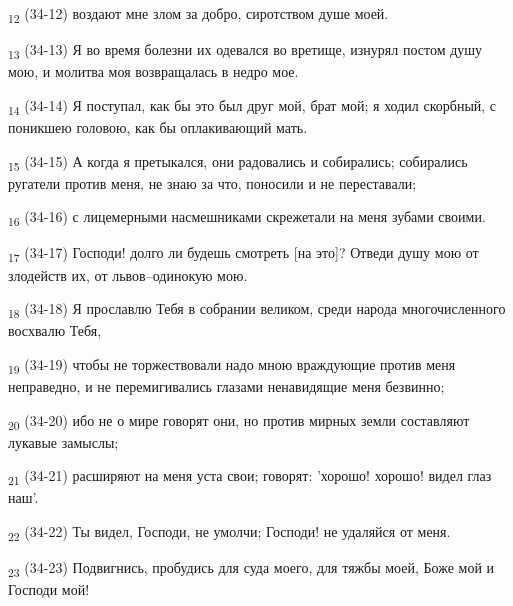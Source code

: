 \begin{tcolorbox}
\textsubscript{12} (34-12) воздают мне злом за добро, сиротством душе моей.
\end{tcolorbox}
\begin{tcolorbox}
\textsubscript{13} (34-13) Я во время болезни их одевался во вретище, изнурял постом душу мою, и молитва моя возвращалась в недро мое.
\end{tcolorbox}
\begin{tcolorbox}
\textsubscript{14} (34-14) Я поступал, как бы это был друг мой, брат мой; я ходил скорбный, с поникшею головою, как бы оплакивающий мать.
\end{tcolorbox}
\begin{tcolorbox}
\textsubscript{15} (34-15) А когда я претыкался, они радовались и собирались; собирались ругатели против меня, не знаю за что, поносили и не переставали;
\end{tcolorbox}
\begin{tcolorbox}
\textsubscript{16} (34-16) с лицемерными насмешниками скрежетали на меня зубами своими.
\end{tcolorbox}
\begin{tcolorbox}
\textsubscript{17} (34-17) Господи! долго ли будешь смотреть [на это]? Отведи душу мою от злодейств их, от львов--одинокую мою.
\end{tcolorbox}
\begin{tcolorbox}
\textsubscript{18} (34-18) Я прославлю Тебя в собрании великом, среди народа многочисленного восхвалю Тебя,
\end{tcolorbox}
\begin{tcolorbox}
\textsubscript{19} (34-19) чтобы не торжествовали надо мною враждующие против меня неправедно, и не перемигивались глазами ненавидящие меня безвинно;
\end{tcolorbox}
\begin{tcolorbox}
\textsubscript{20} (34-20) ибо не о мире говорят они, но против мирных земли составляют лукавые замыслы;
\end{tcolorbox}
\begin{tcolorbox}
\textsubscript{21} (34-21) расширяют на меня уста свои; говорят: 'хорошо! хорошо! видел глаз наш'.
\end{tcolorbox}
\begin{tcolorbox}
\textsubscript{22} (34-22) Ты видел, Господи, не умолчи; Господи! не удаляйся от меня.
\end{tcolorbox}
\begin{tcolorbox}
\textsubscript{23} (34-23) Подвигнись, пробудись для суда моего, для тяжбы моей, Боже мой и Господи мой!
\end{tcolorbox}
